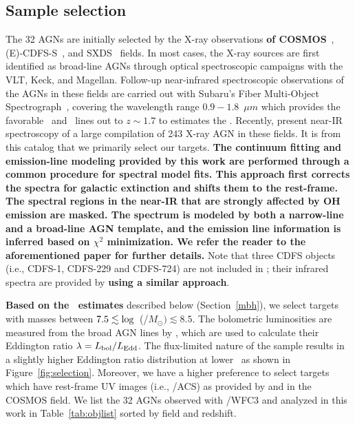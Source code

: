 \documentclass[apj]{emulateapj}
\begin{document}
\subsection{Sample selection}\label{sec:target_selection}

The 32 AGNs are initially selected by the X-ray observations {\bf of COSMOS}~\citep{Civano2016}, (E)-CDFS-S~\citep{Lehmer2005, Xue2011}, and SXDS~\citep{Ueda2008} fields. In most cases, the X-ray sources are first identified as broad-line AGNs through optical spectroscopic campaigns with the VLT, Keck, and Magellan. Follow-up near-infrared spectroscopic observations of the AGNs in these fields are carried out with Subaru's Fiber Multi-Object Spectrograph~\citep[FMOS, ][]{Kimura2010, Nobuta2012,Matsuoka2013}, covering the wavelength range $0.9-1.8$~$\mu m$ which provides the favorable \halpha\ and \hbeta\ lines out to $z\sim1.7$ to estimates the \mbh. Recently, \citet{Schulze2018} present near-IR spectroscopy of a large compilation of 243 X-ray AGN in these fields. It is from this catalog that we primarily select our targets. 
{\bf The continuum fitting and emission-line modeling provided by this work are performed through a common procedure for spectral model fits. This approach first corrects the spectra for galactic extinction and shifts them to the rest-frame. The spectral regions in the near-IR that are strongly affected by OH emission are masked. The spectrum is modeled by both a narrow-line and a broad-line AGN template, and the emission line information is inferred based on $\chi^2$ minimization. We refer the reader to the aforementioned paper for further details.}
Note that three CDFS objects (i.e., CDFS-1, CDFS-229 and CDFS-724) are not included in \citet{Schulze2018}; their infrared spectra are provided by \citet{Suh2015} {\bf using a similar approach}.

{\bf Based on the \mbh\ estimates} described below (Section~\ref{mbh}), we select targets with masses between $7.5 \lesssim {\rm log}$~(\mbh/$M_{\odot})\lesssim8.5$. The bolometric luminosities are measured from the broad AGN lines by \citet[][Section 3.3]{Schulze2018}, which are used to calculate their Eddington ratio $\lambda = L_{\rm bol}/L_{\rm Edd}$. The flux-limited nature of the sample results in a slightly higher Eddington ratio distribution at lower \mbh\, as shown in Figure~\ref{fig:selection}. Moreover, we have a higher preference to select targets which have rest-frame UV images (i.e., \hst/ACS) as provided by \citet{Scoville2007} and \citet{Koekemoer2007} in the COSMOS field. We list the 32 AGNs observed with \hst/WFC3 and analyzed in this work in Table~\ref{tab:objlist} sorted by field and redshift.
\end{document}
